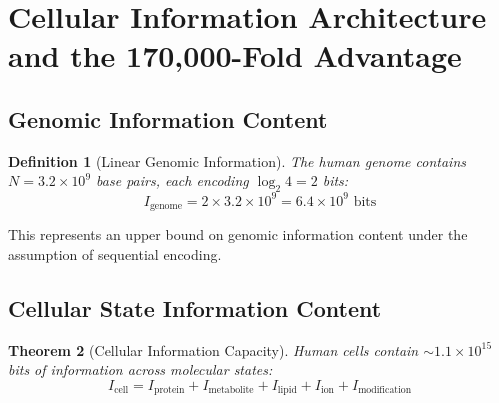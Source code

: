 \documentclass[11pt,a4paper]{article}
\newtheorem{theorem}{Theorem}[section]
\newtheorem{definition}[theorem]{Definition}
\theoremstyle{remark}
\begin{document}
\section{Cellular Information Architecture and the 170,000-Fold Advantage}

\subsection{Genomic Information Content}

\begin{definition}[Linear Genomic Information]
\label{def:genomic_info}
The human genome contains $N = 3.2 \times 10^9$ base pairs, each encoding $\log_2 4 = 2$ bits:
\begin{equation}
I_{\text{genome}} = 2 \times 3.2 \times 10^9 = 6.4 \times 10^9 \text{ bits}
\end{equation}
\end{definition}

This represents an upper bound on genomic information content under the assumption of sequential encoding.

\subsection{Cellular State Information Content}

\begin{theorem}[Cellular Information Capacity]
\label{thm:cellular_capacity}
Human cells contain $\sim 1.1 \times 10^{15}$ bits of information across molecular states:
\begin{equation}
I_{\text{cell}} = I_{\text{protein}} + I_{\text{metabolite}} + I_{\text{lipid}} + I_{\text{ion}} + I_{\text{modification}}
\end{equation}
\end{theorem}
\end{document}
